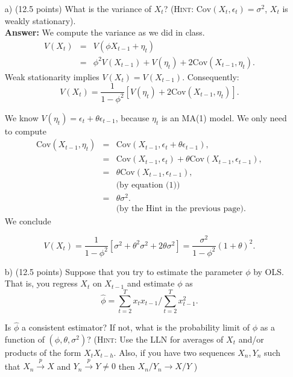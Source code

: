\documentclass[12] {article}
\begin{document}
\begin{itemize}

\item [a)] (12.5 points) What is the variance of $X_t$? ({\scshape{Hint}}: $\textrm{Cov}(X_t,\epsilon_t) = \sigma^2$, $X_t$ is weakly stationary).     \\

\textbf{Answer:} We compute the variance as we did in class. 
\begin{eqnarray*}
V(X_t) &=& V (\phi X_{t-1} + \eta_t) \\
&=& \phi^2 V(X_{t-1}) + V(\eta_t) + 2 \textrm{Cov}(X_{t-1}, \eta_t). 
\end{eqnarray*}
Weak stationarity implies $V(X_t) = V(X_{t-1})$. Consequently:
\[ V(X_t) = \frac{1}{1-\phi^2} \left[ V(\eta_t) + 2 \textrm{Cov}(X_{t-1}, \eta_t)  \right]. \]

We know $V(\eta_t)= \epsilon_t + \theta \epsilon_{t-1}$, because $\eta_t$ is an MA(1) model. We only need to compute 
\begin{eqnarray*}
\textrm{Cov}(X_{t-1}, \eta_t)  &=& \textrm{Cov}(X_{t-1}, \epsilon_{t} + \theta \epsilon_{t-1} ),  \\
&=&  \textrm{Cov}(X_{t-1}, \epsilon_{t}) + \theta \textrm{Cov} ( X_{t-1} ,  \epsilon_{t-1} ), \\
&=&   \theta \textrm{Cov} ( X_{t-1} ,  \epsilon_{t-1} ), \\
&& \textrm{(by equation (1))} \\
&=& \theta \sigma^2. \\ 
&& \textrm{(by the Hint in the previous page)}. 
\end{eqnarray*}
We conclude 

\[ V(X_t) = \frac{1}{1-\phi^2} \left[ \sigma^2 + \theta^2 \sigma^2 + 2 \theta \sigma^2  \right] = \frac{\sigma^2}{1-\phi^2}  (1+\theta)^2   . \]


\item [b)] (12.5 points) Suppose that you try to estimate the parameter $\phi$ by OLS. That is, you regress $X_t$ on $X_{t-1}$ and estimate $\phi$ as
\[ \widehat{\phi} =  \sum_{t=2}^{T} x_t x_{t-1} \Big / \sum_{t=2}^{T} x_{t-1}^2.  \]


Is $\widehat{\phi}$ a consistent estimator? If not, what is the probability limit of $\phi$ as a function of $(\phi, \theta, \sigma^2)$? ({\scshape{Hint:}} Use the LLN for averages of $X_t$ and/or products of the form $X_{t} X_{t-h}$. Also, if you have two sequences $X_n, Y_n$ such that $X_n \overset{p}{\rightarrow} X$ and $Y_n \overset{p}{\rightarrow} Y \neq 0$ then $X_n / Y_n \rightarrow X/Y$ )\\


\end{itemize}
\end{document}

